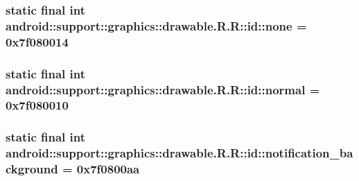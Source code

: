 \hypertarget{classandroid_1_1support_1_1graphics_1_1drawable_1_1_r_1_1id_ff4ee6510135d7e38509e023b72ec959}{
\subsubsection[{none}]{\setlength{\rightskip}{0pt plus 5cm}static final int android::support::graphics::drawable.R.R::id::none = 0x7f080014}}
\label{classandroid_1_1support_1_1graphics_1_1drawable_1_1_r_1_1id_ff4ee6510135d7e38509e023b72ec959}


\hypertarget{classandroid_1_1support_1_1graphics_1_1drawable_1_1_r_1_1id_bca95a7b73ad723098aa93ff22fd5df6}{
\subsubsection[{normal}]{\setlength{\rightskip}{0pt plus 5cm}static final int android::support::graphics::drawable.R.R::id::normal = 0x7f080010}}
\label{classandroid_1_1support_1_1graphics_1_1drawable_1_1_r_1_1id_bca95a7b73ad723098aa93ff22fd5df6}


\hypertarget{classandroid_1_1support_1_1graphics_1_1drawable_1_1_r_1_1id_417a65a94ea26755ff1d46daa6ae3c13}{
\subsubsection[{notification\_\-background}]{\setlength{\rightskip}{0pt plus 5cm}static final int android::support::graphics::drawable.R.R::id::notification\_\-background = 0x7f0800aa}}
\label{classandroid_1_1support_1_1graphics_1_1drawable_1_1_r_1_1id_417a65a94ea26755ff1d46daa6ae3c13}


